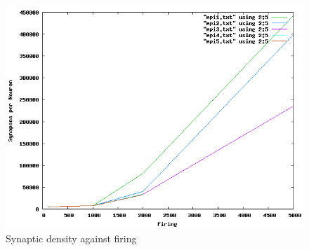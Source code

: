 \begin{figure}[h!]
\begin{center}
\includegraphics[scale = 0.5]{images/evaluation/synapses_firing.png}
\end{center}
\caption{Synaptic density against firing}
\end{figure}



